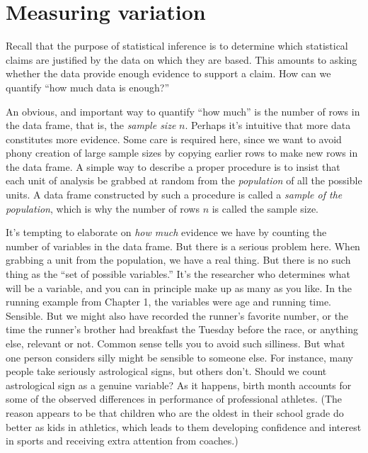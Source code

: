 \documentclass[]{tufte-book}
\begin{document}
\hypertarget{measuring-variation}{%
\chapter{Measuring variation}\label{measuring-variation}}

Recall that the purpose of statistical inference is to determine which statistical claims are justified by the data on which they are based. This amounts to asking whether the data provide enough evidence to support a claim. How can we quantify ``how much data is enough?''

An obvious, and important way to quantify ``how much'' is the number of rows in the data frame, that is, the \emph{sample size} \(n\). Perhaps it's intuitive that more data constitutes more evidence. Some care is required here, since we want to avoid phony creation of large sample sizes by copying earlier rows to make new rows in the data frame. A simple way to describe a proper procedure is to insist that each unit of analysis be grabbed at random from the \emph{population} of all the possible units. A data frame constructed by such a procedure is called a \emph{sample of the population}, which is why the number of rows \(n\) is called the sample size.

It's tempting to elaborate on \emph{how much} evidence we have by counting the number of variables in the data frame. But there is a serious problem here. When grabbing a unit from the population, we have a real thing. But there is no such thing as the ``set of possible variables.'' It's the researcher who determines what will be a variable, and you can in principle make up as many as you like. In the running example from Chapter 1, the variables were age and running time. Sensible. But we might also have recorded the runner's favorite number, or the time the runner's brother had breakfast the Tuesday before the race, or anything else, relevant or not. Common sense tells you to avoid such silliness. But what one person considers silly might be sensible to someone else. For instance, many people take seriously astrological signs, but others don't. Should we count astrological sign as a genuine variable? As it happens, birth month accounts for some of the observed differences in performance of professional athletes. (The reason appears to be that children who are the oldest in their school grade do better as kids in athletics, which leads to them developing confidence and interest in sports and receiving extra attention from coaches.)
\end{document}
